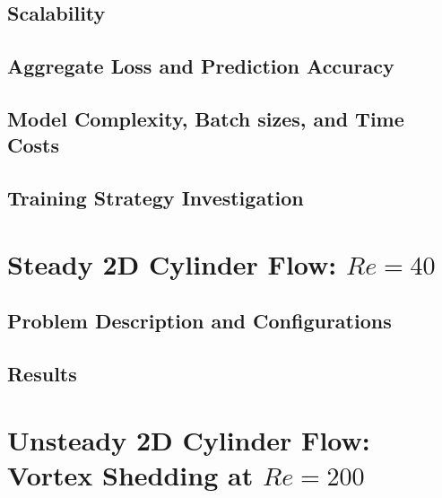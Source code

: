 \documentclass[font=STIX2]{gw-dissertation}[2021/11/19]
\begin{document}
        \subsection{Scalability}
        \label{sec:pinn-2d-tgv-scaling}
        

        \subsection{Aggregate Loss and Prediction Accuracy}
        \label{sec:pinn-2d-tgv-loss-vs-accuracy}
        

        \subsection{Model Complexity, Batch sizes, and Time Costs}
        \label{sec:pinn-2d-tgv-model-complexity}
        

        \subsection{Training Strategy Investigation}
        \label{sec:pinn-2d-tgv-training-strategy}
        

    \section{Steady 2D Cylinder Flow: \texorpdfstring{$Re=40$}{re40}}
    \label{sec:pinn-2d-cylinder-re40}

        \subsection{Problem Description and Configurations}
        \label{sec:pinn-2d-cylinder-re40-conf}
        

        \subsection{Results}
        \label{sec:pinn-2d-cylinder-re40-results}
        

    \section{Unsteady 2D Cylinder Flow: Vortex Shedding at \texorpdfstring{$Re=200$}{re200}}
    \label{sec:pinn-2d-cylinder-re200}
\end{document}
